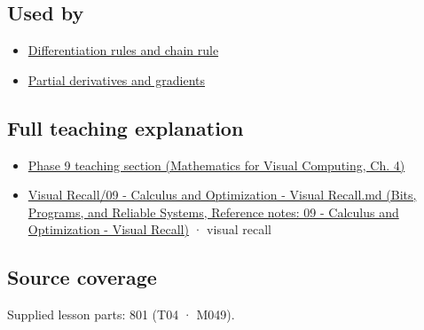 \subsection{Used by}\label{appendix-a59658325cd6-used-by}

\hypertarget{appendix-a59658325cd6-used-by}{}

\begin{itemize}
\tightlist
\item
  \hyperref[appendix-d9f70bdfbc92]{Differentiation rules and chain rule}
\item
  \hyperref[appendix-677b59746ae0]{Partial derivatives and gradients}
\end{itemize}

\subsection{Full teaching explanation}\label{appendix-a59658325cd6-full-teaching-explanation}

\hypertarget{appendix-a59658325cd6-full-teaching-explanation}{}

\begin{itemize}
\tightlist
\item
  \href{../02-Mathematics-for-Visual-Computing/main.pdf\#nameddest=01-foundations-i-ch020-functions-limits-continuity-and-scalar-change}{Phase 9 teaching section (Mathematics for Visual Computing, Ch. 4)}
\item
  \href{../01-Bits-Programs-and-Reliable-Systems/main.pdf\#nameddest=appendix-adf48f5dc5c1}{Visual Recall/09 - Calculus and Optimization - Visual Recall.md (Bits, Programs, and Reliable Systems, Reference notes: 09 - Calculus and Optimization - Visual Recall)} · visual recall
\end{itemize}

\subsection{Source coverage}\label{appendix-a59658325cd6-source-coverage}

\hypertarget{appendix-a59658325cd6-source-coverage}{}

Supplied lesson parts: 801 (T04 · M049).
